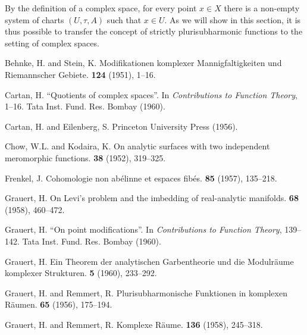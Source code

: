 \documentclass{article}
\theoremstyle{plain}
\begin{document}
By the definition of a complex space, for every point $x\in X$ there is a non-empty system of charts $(U,\tau,A)$ such that $x\in U$.
As we will show in this section, it is thus possible to transfer the concept of strictly plurisubharmonic functions to the setting of complex spaces.



\nocite{*}

\begin{thebibliography}{20}

  {Behnke, H. and Stein, K.}
  \newblock Modifikationen komplexer Mannigfaltigkeiten und Riemannscher Gebiete.
   {\bf 124} (1951), 1--16.

  {Cartan, H.}
  \newblock ``Quotients of complex spaces''.
  \newblock In {\em Contributions to Function Theory}, 1--16.
  \newblock Tata Inst. Fund. Res. Bombay (1960).

  {Cartan, H. and Eilenberg, S.}
  \newblock Princeton University Press (1956).

  {Chow, W.L. and Kodaira, K.}
  \newblock On analytic surfaces with two independent meromorphic functions.
   {\bf 38} (1952), 319--325.

  {Frenkel, J.}
  \newblock Cohomologie non ab\'{e}linne et espaces fib\'{e}s.
   {\bf 85} (1957), 135--218.

  {Grauert, H.}
  \newblock On Levi's problem and the imbedding of real-analytic manifolds.
   {\bf 68} (1958), 460--472.

  {Grauert, H.}
  \newblock ``On point modifications''.
  \newblock In {\em Contributions to Function Theory}, 139--142.
  \newblock Tata Inst. Fund. Res. Bombay (1960).

  {Grauert, H.}
  \newblock Ein Theorem der analytischen Garbentheorie und die Modulr\"{a}ume komplexer Strukturen.
   {\bf 5} (1960), 233--292.

  {Grauert, H. and Remmert, R.}
  \newblock Plurisubharmonische Funktionen in komplexen R\"{a}umen.
   {\bf 65} (1956), 175--194.

  {Grauert, H. and Remmert, R.}
  \newblock Komplexe R\"{a}ume.
   {\bf 136} (1958), 245--318.


\end{thebibliography}
\end{document}
